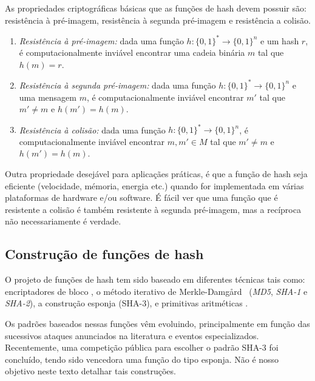 \documentclass{SBCbookchapter}
\newcommand{\ignore}[1]{{}}
\begin{document}
\begin{otherlanguage}{brazilian}
As propriedades criptográficas básicas que as funções de hash devem possuir são: resistência à pré-imagem, resistência à segunda pré-imagem e resistência a colisão. 
\begin{enumerate}
\item \textit{Resistência à pré-imagem:} dada uma função $h: \{0,1\}^{*} \longrightarrow \{0,1\}^{n} $ e um hash $r$, é computacionalmente inviável encontrar uma cadeia binária $m$ tal que $h(m) = r$.
\item \textit{Resistência à segunda pré-imagem:} dada uma função $h: \{0,1\}^{*} \longrightarrow \{0,1\}^{n}$ e uma mensagem $m$, é computacionalmente inviável encontrar $m'$ tal que $m' \neq m$ e $h(m') = h(m)$.
\item \textit{Resistência à colisão:} dada uma função $h: \{0,1\}^{*} \longrightarrow \{0,1\}^{n} $, é computacionalmente inviável encontrar $m, m' \in M$ tal que $m' \neq m$ e $h(m') = h(m)$.
\end{enumerate}
\noindent Outra propriedade desejável  para aplicaçães práticas, é que a função de hash seja eficiente
(velocidade, mémoria, energia etc.) quando for implementada em  várias plataformas de hardware e/ou software. É fácil ver que uma função que é resistente
a colisão é também resistente à segunda pré-imagem, mas a recíproca não necessariamente é verdade.

\subsection{Construção de funções de hash}
O projeto de funções de hash tem sido baseado em diferentes técnicas tais como: encriptadores de bloco \cite{mmo85,winternitz83,preneel79}, o método iterativo de Merkle-Damg{\aa}rd~\cite{merkle:79} (\textit{MD5}, \textit{SHA-1} e \textit{SHA-2}),
a construção esponja \cite{Bertoni07} (SHA-3), e primitivas aritméticas \cite{contini05}. 

Os padrões baseados nessas funções vêm evoluindo, principalmente em função das sucessivos ataques anunciados na literatura e eventos especializados. Recentemente, uma competição pública para escolher o padrão SHA-3 foi concluído, tendo sido vencedora uma função do tipo esponja. Não é nosso objetivo neste texto detalhar tais construções. 

\ignore{

}
\end{otherlanguage}
\end{document}
